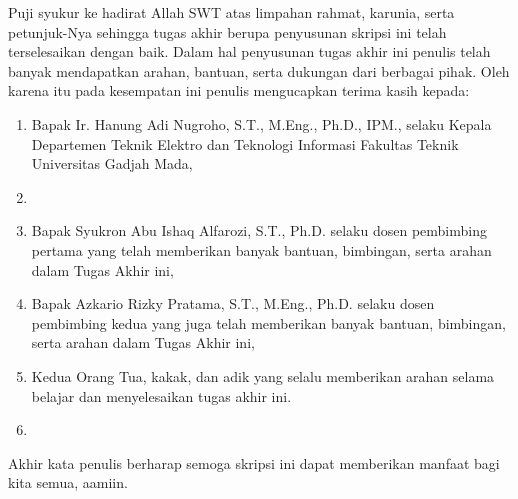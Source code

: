 Puji syukur ke hadirat Allah SWT atas limpahan rahmat, karunia, serta petunjuk-Nya sehingga tugas akhir berupa penyusunan skripsi ini telah terselesaikan dengan baik. Dalam hal penyusunan tugas akhir ini penulis telah banyak mendapatkan arahan, bantuan, serta dukungan dari berbagai pihak. Oleh karena itu pada kesempatan ini penulis mengucapkan terima kasih kepada:

\begin{enumerate}
	\item Bapak Ir. Hanung Adi Nugroho, S.T., M.Eng., Ph.D., IPM., selaku Kepala Departemen Teknik Elektro dan Teknologi Informasi Fakultas Teknik Universitas Gadjah Mada,
	
	\item <isi dengan nama Sekdep>
	
	\item Bapak Syukron Abu Ishaq Alfarozi, S.T., Ph.D. selaku dosen pembimbing pertama yang telah memberikan banyak bantuan, bimbingan, serta arahan dalam Tugas Akhir ini,

	\item Bapak Azkario Rizky Pratama, S.T., M.Eng., Ph.D. selaku dosen pembimbing kedua yang juga telah memberikan banyak bantuan, bimbingan, serta arahan dalam Tugas Akhir ini,
	
	\item Kedua Orang Tua, kakak, dan adik yang selalu memberikan arahan selama belajar dan menyelesaikan tugas akhir ini. 
	
	\item <isi dengan nama orang lainnya>

\end{enumerate}

Akhir kata penulis berharap semoga skripsi ini dapat memberikan manfaat bagi kita semua, aamiin.

